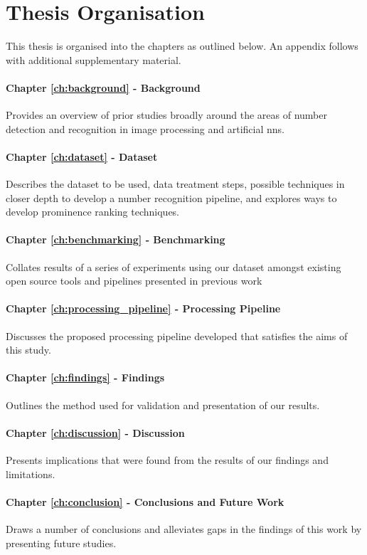 \section{Thesis Organisation}
\label{sec:introduction:organisation}

This thesis is organised into the chapters as outlined below. An appendix follows with additional supplementary material.

\paragraph{Chapter \ref{ch:background} - Background} Provides an overview of prior studies broadly around the areas of number detection and recognition in image processing and artificial \glspl{nn}.

\paragraph{Chapter \ref{ch:dataset} - Dataset} Describes the dataset to be used, data treatment steps, possible techniques in closer depth to develop a number recognition pipeline, and explores ways to develop prominence ranking techniques.

\paragraph{Chapter \ref{ch:benchmarking} - Benchmarking} Collates results of a series of experiments using our dataset amongst existing open source tools and pipelines presented in previous work

\paragraph{Chapter \ref{ch:processing_pipeline} - Processing Pipeline} Discusses the proposed processing pipeline developed that satisfies the aims of this study.

\paragraph{Chapter \ref{ch:findings} - Findings} Outlines the method used for validation and presentation of our results.

\paragraph{Chapter \ref{ch:discussion} - Discussion} Presents implications that were found from the results of our findings and limitations.

\paragraph{Chapter \ref{ch:conclusion} - Conclusions and Future Work} Draws a number of conclusions and alleviates gaps in the findings of this work by presenting future studies.